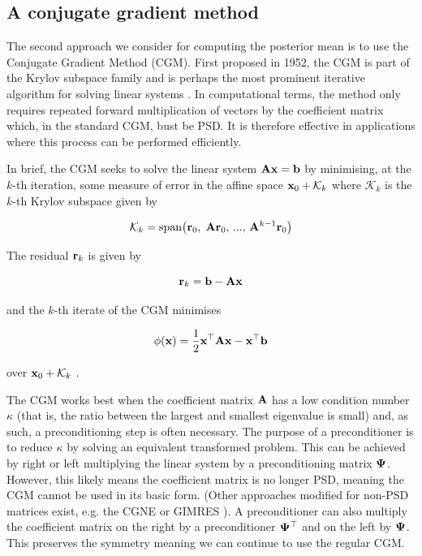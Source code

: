 \subsection{A conjugate gradient method}

\label{sec:CGM}

The second approach we consider for computing the posterior mean is to use the Conjugate Gradient Method (CGM). First proposed in 1952, the CGM is part of the Krylov subspace family and is perhaps the most prominent iterative algorithm for solving linear systems \citep{Hestenes1952}. In computational terms, the method only requires repeated forward multiplication of vectors by the coefficient matrix which, in the standard CGM, bust be PSD. It is therefore effective in applications where this process can be performed efficiently. 

In brief, the CGM seeks to solve the linear system $\mathbf{A} \mathbf{x} = \mathbf{b}$ by minimising, at the $k$-th iteration, some measure of error in the affine space $\mathbf{x}_0 + \mathcal{K}_k$ where $\mathcal{K}_k$ is the $k$-th Krylov subspace given by  

$$
\mathcal{K}_k = \text{span}\big(\mathbf{r}_0, \; \mathbf{A} \mathbf{r}_0, \, ..., \, \mathbf{A}^{k-1} \mathbf{r}_0 \big)
$$

The residual $\mathbf{r}_k$ is given by 

$$
\mathbf{r}_k = \mathbf{b} - \mathbf{A} \mathbf{x}
$$

and the $k$-th iterate of the CGM minimises 

$$
\phi(\mathbf{x}) = \frac{1}{2} \mathbf{x}^\top \mathbf{A} \mathbf{x}  - \mathbf{x}^\top \mathbf{b}
$$

over $\mathbf{x}_0 + \mathcal{K}_k$ \citep{Kelley1995}. 

The CGM works best when the coefficient matrix $\mathbf{A}$ has a low condition number $\kappa$ (that is, the ratio between the largest and smallest eigenvalue is small) and, as such, a preconditioning step is often necessary. The purpose of a preconditioner is to reduce $\kappa$ by solving an equivalent transformed problem. This can be achieved by right or left multiplying the linear system by a preconditioning matrix $\mathbf{\Psi}$. However, this likely means the coefficient matrix is no longer PSD, meaning the CGM cannot be used in its basic form. (Other approaches modified for non-PSD matrices exist, e.g. the CGNE or GIMRES \citep{Elman1982, Saad1986}). A preconditioner can also multiply the coefficient matrix on the right by a preconditioner $\mathbf{\Psi}^\top$ and on the left by $\mathbf{\Psi}$. This preserves the symmetry meaning we can continue to use the regular CGM. 

